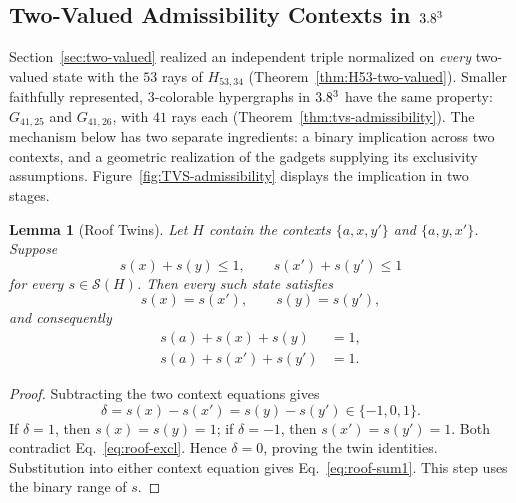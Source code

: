 \documentclass[aps,pra,reprint,superscriptaddress,longbibliography,nofootinbib,floatfix,10pt]{revtex4-2}
\newtheorem{lemma}[theorem]{Lemma}
\theoremstyle{definition}\newtheorem{definition}[theorem]{Definition}
\theoremstyle{remark}\newtheorem{remark}[theorem]{Remark}
\newcommand{\Sc}{\mathcal S}\newcommand{\Cc}{\mathcal C}\newcommand{\Wc}{\mathcal W}
\begin{document}
\subsection{Two-Valued Admissibility Contexts in \texorpdfstring{$3.8^3$}{R3}}\label{sec:tvs-admissibility}

Section~\ref{sec:two-valued} realized an independent triple normalized on \emph{every} two-valued state with the $53$ rays of $H_{53,34}$ (Theorem~\ref{thm:H53-two-valued}). Smaller faithfully represented, $3$-colorable hypergraphs in $3.8^3$ have the same property: $G_{41,25}$ and $G_{41,26}$, with $41$ rays each (Theorem~\ref{thm:tvs-admissibility}). The mechanism below has two separate ingredients: a binary implication across two contexts, and a geometric realization of the gadgets supplying its exclusivity assumptions. Figure~\ref{fig:TVS-admissibility} displays the implication in two stages.

\begin{lemma}[Roof Twins]\label{lem:roof-twin}
Let $H$ contain the contexts $\{a,x,y'\}$ and $\{a,y,x'\}$. Suppose
\begin{equation}\label{eq:roof-excl}
s(x)+s(y)\le1,\qquad s(x')+s(y')\le1
\end{equation}
for every $s\in\Sc(H)$. Then every such state satisfies
\begin{equation}\label{eq:roof-twins}
s(x)=s(x'),\qquad s(y)=s(y'),
\end{equation}
and consequently
\begin{equation}\label{eq:roof-sum1}
\begin{aligned}
s(a)+s(x)+s(y)&=1,\\
s(a)+s(x')+s(y')&=1.
\end{aligned}
\end{equation}
\end{lemma}
\begin{proof}
Subtracting the two context equations gives
\[
\delta=s(x)-s(x')=s(y)-s(y')\in\{-1,0,1\}.
\]
If $\delta=1$, then $s(x)=s(y)=1$; if $\delta=-1$, then $s(x')=s(y')=1$. Both contradict Eq.~\eqref{eq:roof-excl}. Hence $\delta=0$, proving the twin identities. Substitution into either context equation gives Eq.~\eqref{eq:roof-sum1}. This step uses the binary range of $s$.
\end{proof}
\end{document}
